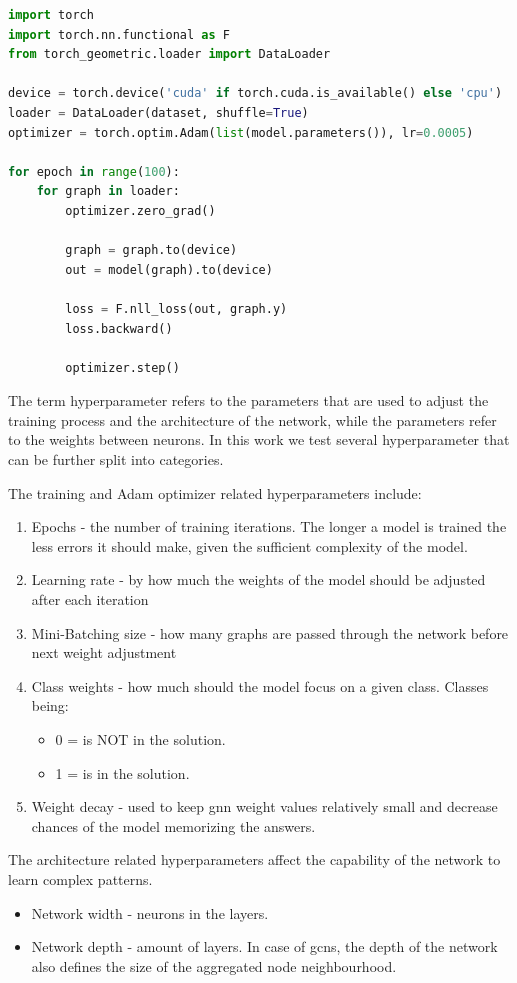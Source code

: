 \begin{lstlisting}[caption={Training GCN with Pytorch}, label={Training GCN with Pytorch}, language=Python]
import torch
import torch.nn.functional as F
from torch_geometric.loader import DataLoader

device = torch.device('cuda' if torch.cuda.is_available() else 'cpu')
loader = DataLoader(dataset, shuffle=True)
optimizer = torch.optim.Adam(list(model.parameters()), lr=0.0005)

for epoch in range(100):        
    for graph in loader:
        optimizer.zero_grad()
        
        graph = graph.to(device)
        out = model(graph).to(device)   
            
        loss = F.nll_loss(out, graph.y)
        loss.backward()

        optimizer.step()
\end{lstlisting}

The term hyperparameter refers to the parameters that are used to adjust the training process and the architecture of the network, while the parameters refer to the weights between neurons. In this work we test several hyperparameter that can be further split into categories.

The training and Adam optimizer related hyperparameters include:
\begin{enumerate}
\item Epochs - the number of training iterations. The longer a model is trained the less errors it should make, given the sufficient complexity of the model.
\item Learning rate - by how much the weights of the model should be adjusted after each iteration
\item Mini-Batching size - how many graphs are passed through the network before next weight adjustment
\item Class weights - how much should the model focus on a given class. Classes being: 
	\begin{itemize}
	\item 0 = is NOT in the solution.
	\item 1 = is in the solution.
	\end{itemize}	
\item Weight decay - used to keep \gls{gnn} weight values relatively small and decrease chances of the model memorizing the answers. 
\end{enumerate}

The architecture related hyperparameters affect the capability of the network to learn complex patterns. 
\begin{itemize}
\item Network width - neurons in the layers.
\item Network depth - amount of layers. In case of \gls{gcn}s, the depth of the network also defines the size of the aggregated node neighbourhood. 
\end{itemize}

